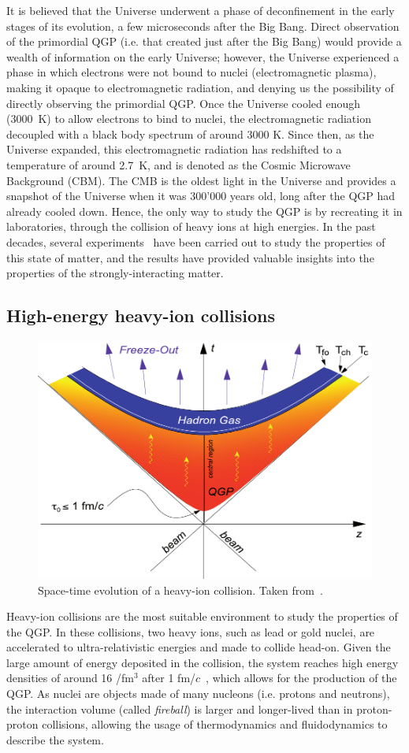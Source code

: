 It is believed that the Universe underwent a phase of deconfinement in the early stages of its evolution, a few microseconds after the Big Bang. Direct observation of the primordial QGP (i.e. that created just after the Big Bang) would provide a wealth of information on the early Universe; however, the Universe experienced a phase in which electrons were not bound to nuclei (electromagnetic plasma), making it opaque to electromagnetic radiation, and denying us the possibility of directly observing the primordial QGP. Once the Universe cooled enough (3000~K) to allow electrons to bind to nuclei, the electromagnetic radiation decoupled with a black body spectrum of around 3000 K. Since then, as the Universe expanded, this electromagnetic radiation has redshifted to a temperature of around 2.7~K, and is denoted as the Cosmic Microwave Background (CBM). The CMB is the oldest light in the Universe and provides a snapshot of the Universe when it was 300'000 years old, long after the QGP had already cooled down. Hence, the only way to study the QGP is by recreating it in laboratories, through the collision of heavy ions at high energies. In the past decades, several experiments~\cite{ALICE:2022wpn, NA38:2000wlp, NA50:1997hlx, Nouicer:2009fy} have been carried out to study the properties of this state of matter, and the results have provided valuable insights into the properties of the strongly-interacting matter.

\subsection{High-energy heavy-ion collisions}
\begin{figure}[t]
  \centering
  \includegraphics[width=0.7\linewidth]{Figures/Chapter 1/Bild_18.pdf}
  \caption{Space-time evolution of a heavy-ion collision. Taken from~\cite{Stock:2008ru}.}
  \label{fig:HeavyIonCollisions}
\end{figure}
Heavy-ion collisions are the most suitable environment to study the properties of the QGP. In these collisions, two heavy ions, such as lead or gold nuclei, are accelerated to ultra-relativistic energies and made to collide head-on. Given the large amount of energy deposited in the collision, the system reaches high energy densities of around 16 \gev/fm$^3$ after 1 fm/$c$~\cite{Loizides:2011ys}, which allows for the production of the QGP. As nuclei are objects made of many nucleons (i.e. protons and neutrons), the interaction volume (called \emph{fireball}) is larger and longer-lived than in proton-proton collisions, allowing the usage of thermodynamics and fluidodynamics to describe the system. 

